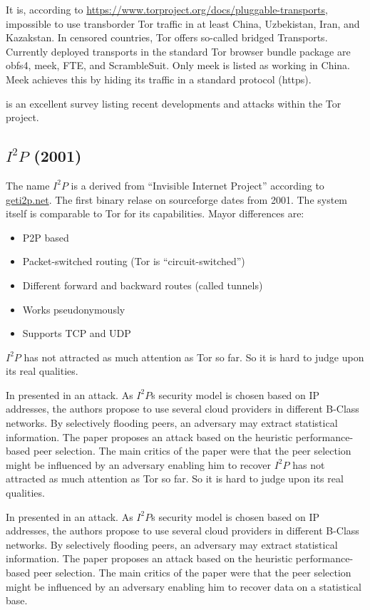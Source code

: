 It is, according to \url{https://www.torproject.org/docs/pluggable-transports}, impossible to use transborder Tor traffic in at least China, Uzbekistan, Iran, and Kazakstan. In censored countries, Tor offers so-called bridged Transports. Currently deployed transports in the standard Tor browser bundle package are obfs4, meek, FTE, and ScrambleSuit. Only meek is listed as working in China. Meek achieves this by hiding its traffic in a standard protocol (https).

\cite{saleh2018shedding} is an excellent survey listing recent developments and attacks within the Tor project.

\subsection{\texorpdfstring{$I^2P$}{I2P} (2001)}
The name $I^2P$ is a derived from  ``Invisible Internet Project'' according to \href{https://geti2p.net/}{geti2p.net}. The first binary relase on sourceforge dates from 2001. The system itself is comparable to Tor for its capabilities. Mayor differences are:
\begin{itemize}
	\item P2P based
	\item Packet-switched routing (Tor is ``circuit-switched'')
	\item Different forward and backward routes (called tunnels)
	\item Works pseudonymously
	\item Supports TCP and UDP
\end{itemize}

$I^2P$ has not attracted as much attention as Tor so far. So it is hard to judge upon its real qualities.

In \citeyear{pets2011-i2p} \citeauthor{pets2011-i2p} presented in \cite{pets2011-i2p} an attack. As $I^2P$s security model is chosen based on IP addresses, the authors propose to use several cloud providers in different B-Class networks. By selectively flooding peers, an adversary may extract statistical information. The paper proposes an attack based on the heuristic performance-based peer selection. The main critics of the paper were that the peer selection might be influenced by an adversary enabling him to recover $I^2P$ has not attracted as much attention as Tor so far. So it is hard to judge upon its real qualities.

In \citeyear{pets2011-i2p} \citeauthor{pets2011-i2p} presented in \cite{pets2011-i2p} an attack. As $I^2P$s security model is chosen based on IP addresses, the authors propose to use several cloud providers in different B-Class networks. By selectively flooding peers, an adversary may extract statistical information. The paper proposes an attack based on the heuristic performance-based peer selection. The main critics of the paper were that the peer selection might be influenced by an adversary enabling him to recover data on a statistical base.

